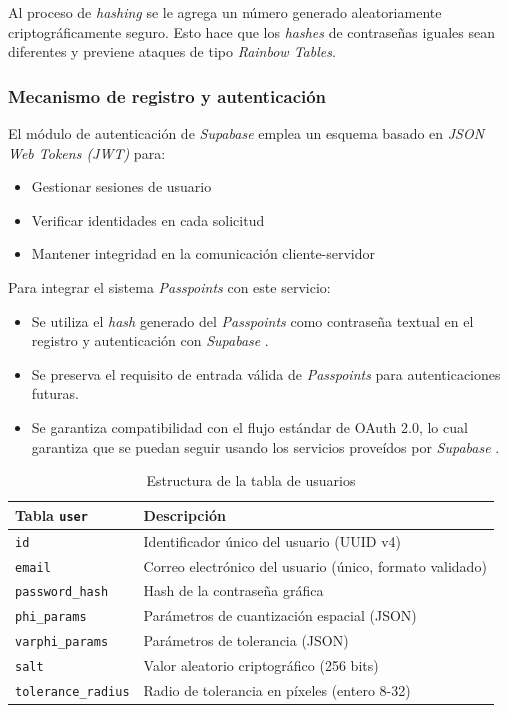 Al proceso de \textit{hashing} se le agrega un n\'umero generado aleatoriamente criptogr\'aficamente seguro. Esto hace que los \textit{hashes} de contrase\~nas iguales sean diferentes y previene ataques de tipo \textit{Rainbow Tables}.

\subsubsection{Mecanismo de registro y autenticaci\'on}
El módulo de autenticación de \textit{Supabase}  emplea un esquema basado en \textit{JSON Web Tokens (JWT)} para:
\begin{itemize}
	\item Gestionar sesiones de usuario
	\item Verificar identidades en cada solicitud
	\item Mantener integridad en la comunicación cliente-servidor
\end{itemize}

Para integrar el sistema \textit{Passpoints} con este servicio:
\begin{itemize}
	\item Se utiliza el \textit{hash} generado del \textit{Passpoints} como contraseña textual en el registro y autenticaci\'on con \textit{Supabase} .
	\item Se preserva el requisito de entrada válida de \textit{Passpoints} para autenticaciones futuras.
	\item Se garantiza compatibilidad con el flujo estándar de OAuth 2.0, lo cual garantiza que se puedan seguir usando los servicios prove\'idos por \textit{Supabase} \cite{supabase}.
\end{itemize}


\begin{table}[ht]
	\centering
	\caption{Estructura de la tabla de usuarios}
	\label{tab:bd-esquema}
	\begin{tabularx}{\textwidth}{lX}
		\toprule
		\textbf{Tabla \texttt{user}} & \textbf{Descripción} \\
		\midrule
		\texttt{id} & Identificador único del usuario (UUID v4) \\
		\texttt{email} & Correo electrónico del usuario (único, formato validado) \\
		\texttt{password\_hash} & Hash de la contraseña gráfica \\
		\texttt{phi\_params} & Parámetros de cuantización espacial (JSON) \\
		\texttt{varphi\_params} & Parámetros de tolerancia (JSON) \\
		\texttt{salt} & Valor aleatorio criptográfico (256 bits) \\
		\texttt{tolerance\_radius} & Radio de tolerancia en píxeles (entero 8-32) \\
	
		\bottomrule
	\end{tabularx}
\end{table}


